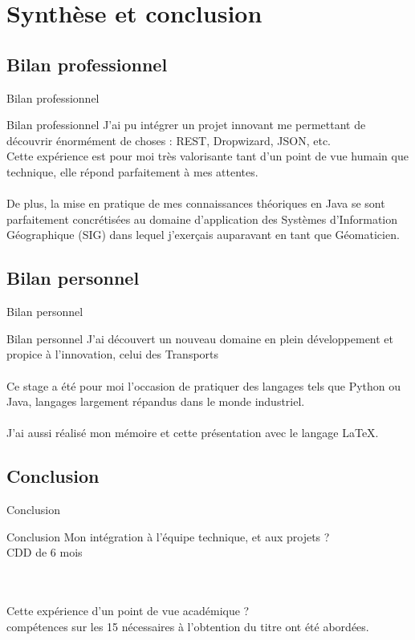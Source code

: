 \documentclass[utf8,compress]{beamer}
\begin{document}
\section{Synthèse et conclusion}
\subsection{Bilan professionnel}
\begin{frame}{Bilan professionnel}
\begin{block}{Bilan professionnel}
J'ai pu intégrer un projet innovant me permettant de découvrir énormément de choses : REST, Dropwizard, JSON, etc.\\

Cette expérience est pour moi très valorisante tant d'un point de vue humain que technique, elle répond parfaitement à mes attentes.\\

~\\
De plus, la mise en pratique de mes connaissances théoriques en Java se sont parfaitement concrétisées au domaine d'application des Systèmes d'Information Géographique (SIG) dans lequel j'exerçais auparavant en tant que Géomaticien.
\end{block}
\end{frame}
\subsection{Bilan personnel}
\begin{frame}{Bilan personnel}
\begin{block}{Bilan personnel}
J'ai découvert un nouveau domaine en plein développement et propice à l'innovation, celui des \og Transports\fg \\
~\\

Ce stage a été pour moi l'occasion de pratiquer des langages tels que Python ou Java, langages largement répandus dans le monde industriel.\\
~\\

J'ai aussi réalisé mon mémoire et cette présentation avec le langage  \LaTeX{}.
\end{block}
\end{frame}


\subsection{Conclusion}
\begin{frame}{Conclusion}
\begin{block}{Conclusion}
Mon intégration à l'équipe technique, et aux projets ? 
~\\
\textrightarrow  	CDD de 6 mois

~\\
~\\

Cette expérience d'un point de vue académique ?
~\\
 compétences sur les 15 nécessaires à l'obtention du titre ont été abordées. 
\end{block}
\end{frame}
\end{document}
